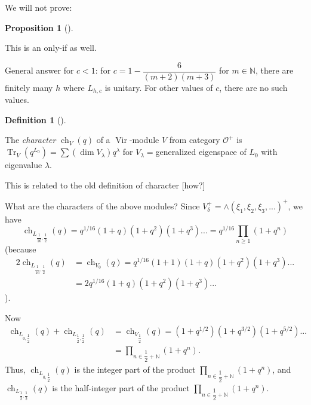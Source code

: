 \documentclass
[numbers=enddot,12pt,final,onecolumn,german,notitlepage]{scrartcl}%
\theoremstyle{definition}
\newtheorem{prop}[theo]{Proposition}
\newenvironment{proposition}[1][]
{\begin{prop}[#1]\begin{leftbar}}
{\end{leftbar}\end{prop}}
\newtheorem{defi}[theo]{Definition}
\newenvironment{definition}[1][]
{\begin{defi}[#1]\begin{leftbar}}
{\end{leftbar}\end{defi}}
\begin{document}
We will not prove:

\begin{proposition}
This is an only-if as well.
\end{proposition}

General answer for $c<1$: for $c=1-\dfrac{6}{\left(  m+2\right)  \left(
m+3\right)  }$ for $m\in\mathbb{N}$, there are finitely many $h$ where
$L_{h,c}$ is unitary. For other values of $c$, there are no such values.

\begin{definition}
The \textit{character }$\operatorname*{ch}\nolimits_{V}\left(  q\right)  $ of
a $\operatorname*{Vir}$-module $V$ from category $\mathcal{O}^{+}$ is
$\operatorname*{Tr}\nolimits_{V}\left(  q^{L_{0}}\right)  =\sum\left(  \dim
V_{\lambda}\right)  q^{\lambda}$ for $V_{\lambda}=$generalized eigenspace of
$L_{0}$ with eigenvalue $\lambda$.
\end{definition}

This is related to the old definition of character [how?]

What are the characters of the above modules? Since $V_{\delta}^{+}%
=\wedge\left(  \xi_{1},\xi_{2},\xi_{3},...\right)  ^{+}$, we have%
\[
\operatorname*{ch}\nolimits_{L_{\dfrac{1}{16},\dfrac{1}{2}}}\left(  q\right)
=q^{1/16}\left(  1+q\right)  \left(  1+q^{2}\right)  \left(  1+q^{3}\right)
...=q^{1/16}\prod\limits_{n\geq1}\left(  1+q^{n}\right)
\]
(because
\begin{align*}
2\operatorname*{ch}\nolimits_{L_{\dfrac{1}{16},\dfrac{1}{2}}}\left(  q\right)
&  =\operatorname*{ch}\nolimits_{V_{0}}\left(  q\right)  =q^{1/16}\left(
1+1\right)  \left(  1+q\right)  \left(  1+q^{2}\right)  \left(  1+q^{3}%
\right)  ...\\
&  =2q^{1/16}\left(  1+q\right)  \left(  1+q^{2}\right)  \left(
1+q^{3}\right)  ...
\end{align*}
).

Now%
\begin{align*}
\operatorname*{ch}\nolimits_{L_{0,\dfrac{1}{2}}}\left(  q\right)
+\operatorname*{ch}\nolimits_{L_{\dfrac{1}{2},\dfrac{1}{2}}}\left(  q\right)
&  =\operatorname*{ch}\nolimits_{V_{\dfrac{1}{2}}}\left(  q\right)  =\left(
1+q^{1/2}\right)  \left(  1+q^{3/2}\right)  \left(  1+q^{5/2}\right)  ...\\
&  =\prod\limits_{n\in\dfrac{1}{2}+\mathbb{N}}\left(  1+q^{n}\right)  .
\end{align*}
Thus, $\operatorname*{ch}\nolimits_{L_{0,\dfrac{1}{2}}}\left(  q\right)  $ is
the integer part of the product $\prod\limits_{n\in\dfrac{1}{2}+\mathbb{N}%
}\left(  1+q^{n}\right)  $, and $\operatorname*{ch}\nolimits_{L_{\dfrac{1}%
{2},\dfrac{1}{2}}}\left(  q\right)  $ is the half-integer part of the product
$\prod\limits_{n\in\dfrac{1}{2}+\mathbb{N}}\left(  1+q^{n}\right)  $.
\end{document}
